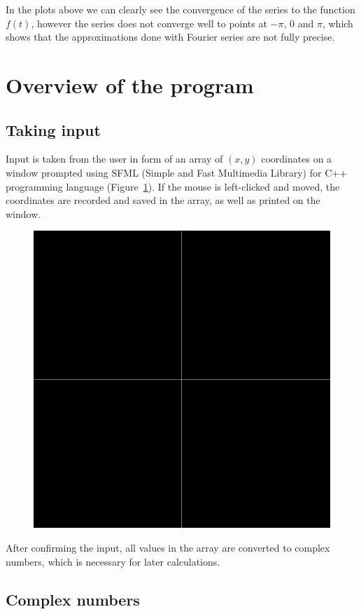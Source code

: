 \documentclass[titlepage]{article}
\begin{document}
    In the plots above we can clearly see the convergence of the series to the
    function $f(t)$, however the series does not converge well to points at
    $-\pi$, $0$ and $\pi$, which shows that the approximations done with Fourier
    series are not fully precise.


\section{Overview of the program} 

\subsection{Taking input}
    
    Input is taken from the user in form of an array of $(x,y)$ coordinates on 
    a window prompted using SFML (Simple and Fast Multimedia Library) for C++ 
    programming language (Figure~\ref{fig:input_window}). If the mouse is 
    left-clicked and moved, the coordinates
    are recorded and saved in the array, as well as printed on the window. 
    \begin{figure}[H]
        \caption{}
        \centering
        \includegraphics[width=0.3\linewidth]{input_window}
        \label{fig:input_window}
    \end{figure}
    After confirming the input, all values in the array are converted to complex
    numbers, which is necessary for later calculations.

\subsection{Complex numbers}
\end{document}
